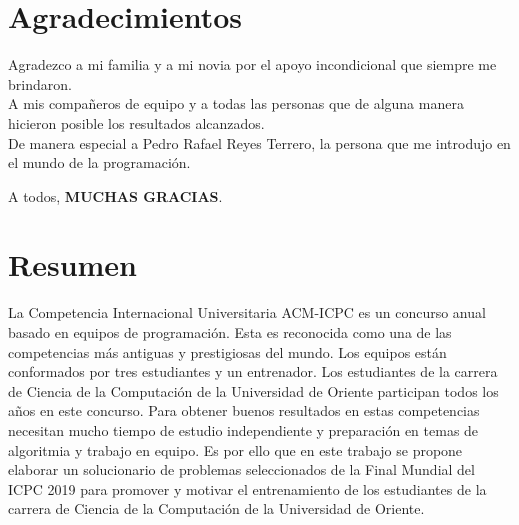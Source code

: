 \documentclass{report}
\begin{document}




\setlength\parindent{0pt} %


\chapter*{Agradecimientos}
Agradezco a mi familia y a mi novia por el apoyo incondicional que siempre me brindaron.\\[0.2cm] 
A mis compa\~neros de equipo y a todas las personas que de alguna manera hicieron posible los resultados alcanzados.\\[0.2cm]
De manera especial a Pedro Rafael Reyes Terrero, la persona que me introdujo en el mundo de la programaci\'on.\\
\begin{flushright}
A todos, {\bf MUCHAS GRACIAS}.
\end{flushright}



\chapter*{Resumen}
La Competencia Internacional Universitaria ACM-ICPC es un concurso anual basado en equipos de programaci\'on. Esta es reconocida como una de las competencias m\'as antiguas y prestigiosas del mundo. Los equipos est\'an conformados por tres estudiantes y un entrenador.
Los estudiantes de la carrera de Ciencia de la Computaci\'on de la Universidad de Oriente participan todos los a\~nos en este concurso. Para obtener buenos resultados en estas competencias necesitan mucho tiempo de estudio independiente y preparaci\'on en temas de algoritmia y trabajo en equipo. Es por ello que en este trabajo se propone elaborar un solucionario de problemas seleccionados de la Final Mundial del ICPC 2019 para promover y motivar el entrenamiento de los estudiantes de la carrera de Ciencia de la Computaci\'on de la Universidad de Oriente.%
\end{document}

